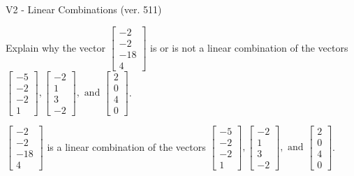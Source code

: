 \begin{exercise}
  \begin{exerciseTitle}V2 - Linear Combinations (ver. 511)\end{exerciseTitle}
  \begin{exerciseStatement}
    Explain why the vector \(\left[\begin{array}{c}
-2 \\
-2 \\
-18 \\
4
\end{array}\right]\)  is or is not a linear 
	combination of the vectors \(\left[\begin{array}{c}
-5 \\
-2 \\
-2 \\
1
\end{array}\right] , \left[\begin{array}{c}
-2 \\
1 \\
3 \\
-2
\end{array}\right] , \text{ and } \left[\begin{array}{c}
2 \\
0 \\
4 \\
0
\end{array}\right]\).
	


  \end{exerciseStatement}
  \begin{exerciseAnswer}
   \(\left[\begin{array}{c}
-2 \\
-2 \\
-18 \\
4
\end{array}\right]\) 
  	 is  
	a linear combination of the vectors \(\left[\begin{array}{c}
-5 \\
-2 \\
-2 \\
1
\end{array}\right] , \left[\begin{array}{c}
-2 \\
1 \\
3 \\
-2
\end{array}\right] , \text{ and } \left[\begin{array}{c}
2 \\
0 \\
4 \\
0
\end{array}\right]\).

	
  


  \end{exerciseAnswer}
\end{exercise}